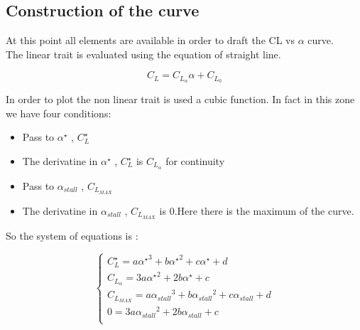\subsection{Construction of the curve}
At this point all elements are available in order to draft the CL vs $\alpha$ curve.\\ The linear trait is evaluated using the equation of straight line.

\begin{equation}
C_L= C_{L_\alpha} \alpha + C_{L_0}
\end{equation}


In order to plot the non linear trait is used a cubic function. In fact in this zone we have four conditions:

\begin{itemize}
\item Pass to $\alpha^{\star}$ , $C_L^{\star}$
\item The derivatine in  $\alpha^{\star}$ , $C_L^{\star}$ is $C_{L_\alpha}$ for continuity
\item Pass to $\alpha_{stall}$ , $C_{L_{MAX}}$
\item The derivatine in  $\alpha_{stall}$ , $C_{L_{MAX}}$ is $0$.Here there is the maximum of the curve.
\end{itemize}

So the system of equations is :

\begin{equation}
\begin{cases}
 C_L^{\star} = a {\alpha^{\star}}^3 +  b {\alpha^{\star}}^2 +  c {\alpha^{\star}} + d \\
 C_{L_\alpha} = 3 a {\alpha^{\star}}^2 +  2b {\alpha^{\star}} +  c  \\ 
 C_{L_{MAX}} = a {\alpha_{stall}}^3 +  b {\alpha_{stall}}^2 +  c {\alpha_{stall}} + d \\
0 = 3 a {\alpha_{stall}}^2 +  2b {\alpha_{stall}} +  c  \\ 
  \end{cases}
\end{equation}




